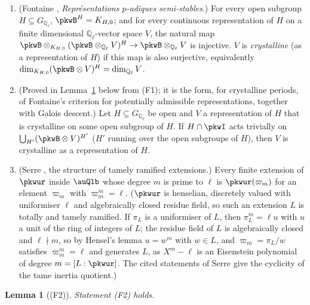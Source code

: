 \documentclass[10pt]{amsart}
\newtheorem{lemma}[theorem]{Lemma}
\theoremstyle{definition}
\theoremstyle{remark}
\newcommand{\Q}{\mathbb Q}
\begin{document}
\begin{enumerate}
\item[(F1)] (Fontaine \cite[1.4.1--1.4.2, 5.1.2 and 5.6.1]{pkfFontaineIII}, \emph{Repr\'esentations $p$-adiques semi-stables}.) For every open subgroup $H\subseteq G_{\Q_\ell}$, $\pkwB^{H}=K_{H,0}$; and for
every continuous representation of $H$ on a finite dimensional $\Q_\ell$-vector space $V$, the natural
map $\pkwB\otimes_{K_{H,0}}(\pkwB\otimes_{\Q_\ell}V)^H\to\pkwB\otimes_{\Q_\ell}V$ is injective. $V$ is
\emph{crystalline} (as a representation of $H$) if this map is also surjective, equivalently
$\dim_{K_{H,0}}(\pkwB\otimes V)^H=\dim_{\Q_\ell}V$.
\item[(F2)] (Proved in Lemma~\ref{pkw:F2} below from (F1); it is the form, for crystalline periods, of
Fontaine's criterion \cite[1.8.5]{pkfFontaineIII} for potentially admissible representations,
together with Galois descent.) Let $H\subseteq
G_{\Q_\ell}$ be open and $V$ a representation of $H$ that is crystalline on some open subgroup of $H$. If
$H\cap\pkwI$ acts trivially on $\bigcup_{H'}(\pkwB\otimes V)^{H'}$ ($H'$ running over the open subgroups
of $H$), then $V$ is crystalline as a representation of $H$.
\item[(F3)] (Serre \cite[IV, \S2, Proposition~7 and Corollary~1, p.~67]{SerreLF}, the structure of tamely ramified extensions.) Every finite extension of $\pkwur$ inside $\auQlb$ whose degree $m$ is prime to $\ell$ is
$\pkwur(\varpi_m)$ for an element $\varpi_m$ with $\varpi_m^m=\ell$. ($\pkwur$ is henselian, discretely
valued with uniformiser $\ell$ and algebraically closed residue field, so such an extension $L$ is totally
and tamely ramified. If $\pi_L$ is a uniformiser of $L$, then $\pi_L^m=\ell u$ with $u$ a unit of the ring of
integers of $L$; the residue field of $L$ is algebraically closed and $\ell\nmid m$, so by Hensel's lemma
$u=w^m$ with $w\in L$, and $\varpi_m=\pi_L/w$ satisfies $\varpi_m^m=\ell$ and generates $L$, as
$X^m-\ell$ is an Eisenstein polynomial of degree $m=[L:\pkwur]$. The cited statements of Serre give the
cyclicity of the tame inertia quotient.)
\end{enumerate}

\begin{lemma}[(F2)]\label{pkw:F2}
Statement (F2) holds.
\end{lemma}
\end{document}
